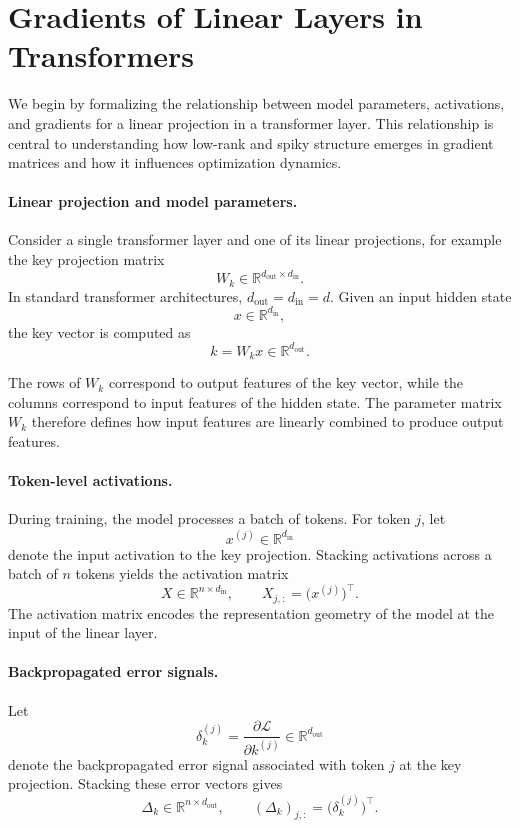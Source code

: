 \section{Gradients of Linear Layers in Transformers}
\label{sec:gradients_linear_layers}

We begin by formalizing the relationship between model parameters, activations, and
gradients for a linear projection in a transformer layer.
This relationship is central to understanding how low-rank and spiky structure
emerges in gradient matrices and how it influences optimization dynamics.

\paragraph{Linear projection and model parameters.}
Consider a single transformer layer and one of its linear projections, for example
the key projection matrix
\[
W_k \in \mathbb{R}^{d_{\text{out}} \times d_{\text{in}}}.
\]
In standard transformer architectures, $d_{\text{out}} = d_{\text{in}} = d$.
Given an input hidden state
\[
x \in \mathbb{R}^{d_{\text{in}}},
\]
the key vector is computed as
\[
k = W_k x \in \mathbb{R}^{d_{\text{out}}}.
\]

The rows of $W_k$ correspond to output features of the key vector, while the columns
correspond to input features of the hidden state.
The parameter matrix $W_k$ therefore defines how input features are linearly combined
to produce output features.

\paragraph{Token-level activations.}
During training, the model processes a batch of tokens.
For token $j$, let
\[
x^{(j)} \in \mathbb{R}^{d_{\text{in}}}
\]
denote the input activation to the key projection.
Stacking activations across a batch of $n$ tokens yields the activation matrix
\[
X \in \mathbb{R}^{n \times d_{\text{in}}},
\qquad
X_{j,:} = \bigl(x^{(j)}\bigr)^\top.
\]
The activation matrix encodes the representation geometry of the model at the input
of the linear layer.

\paragraph{Backpropagated error signals.}
Let
\[
\delta_k^{(j)} = \frac{\partial \mathcal{L}}{\partial k^{(j)}}
\in \mathbb{R}^{d_{\text{out}}}
\]
denote the backpropagated error signal associated with token $j$ at the key
projection.
Stacking these error vectors gives
\[
\Delta_k \in \mathbb{R}^{n \times d_{\text{out}}},
\qquad
(\Delta_k)_{j,:} = \bigl(\delta_k^{(j)}\bigr)^\top.
\]

